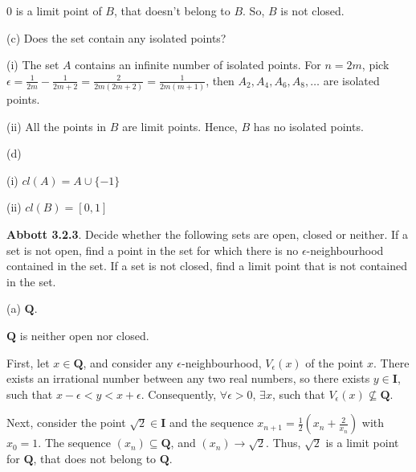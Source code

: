 \documentclass[10pt]{article}
\begin{document}
$\displaystyle 0$ is a limit point of $\displaystyle B$, that doesn't belong to $\displaystyle B$. So, $\displaystyle B$ is not closed.



(c) Does the set contain any isolated points?



(i) The set $\displaystyle A$ contains an infinite number of isolated points. For $\displaystyle n=2m$, pick $\displaystyle \epsilon =\frac{1}{2m} -\frac{1}{2m+2} =\frac{2}{2m( 2m+2)} =\frac{1}{2m( m+1)}$, then $\displaystyle A_{2} ,A_{4} ,A_{6} ,A_{8} ,\dotsc $ are isolated points.



(ii) All the points in $\displaystyle B$ are limit points. Hence, $\displaystyle B$ has no isolated points.



(d) 



(i) $\displaystyle cl( A) =A\cup \{-1\}$

(ii) $\displaystyle cl( B) =[ 0,1]$



\textbf{Abbott 3.2.3}. Decide whether the following sets are open, closed or neither. If a set is not open, find a point in the set for which there is no $\displaystyle \epsilon $-neighbourhood contained in the set. If a set is not closed, find a limit point that is not contained in the set.



(a) $\displaystyle \mathbf{Q}$.



$\displaystyle \mathbf{Q}$ is neither open nor closed. 



First, let $\displaystyle x\in \mathbf{Q}$, and consider any $\displaystyle \epsilon $-neighbourhood, $\displaystyle V_{\epsilon }( x)$ of the point $\displaystyle x$. There exists an irrational number between any two real numbers, so there exists $\displaystyle y\in \mathbf{I}$, such that $\displaystyle x-\epsilon < y< x+\epsilon $. Consequently, $\displaystyle \forall \epsilon  >0$, $\displaystyle \exists x$, such that $\displaystyle V_{\epsilon }( x) \nsubseteq \mathbf{Q}$. 



Next, consider the point $\displaystyle \sqrt{2} \in \mathbf{I}$ and the sequence $\displaystyle x_{n+1} =\frac{1}{2}\left( x_{n} +\frac{2}{x_{n}}\right)$ with $\displaystyle x_{0} =1$. The sequence $\displaystyle ( x_{n}) \subseteq \mathbf{Q}$, and $\displaystyle ( x_{n})\rightarrow \sqrt{2}$. Thus, $\displaystyle \sqrt{2}$ is a limit point for $\displaystyle \mathbf{Q}$, that does not belong to $\displaystyle \mathbf{Q}$.
\end{document}
